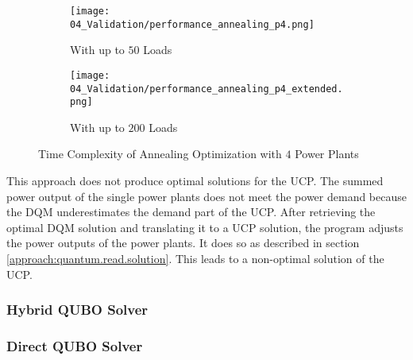 \begin{figure}
  \begin{subfigure}[b]{0.5 \textwidth}
    \centering
    \texttt{[image: 04\_Validation/performance\_annealing\_p4.png]}
    \caption{With up to $50$ Loads}
    \label{figure:validation.annealing.performance}
  \end{subfigure}
  \begin{subfigure}[b]{0.5 \textwidth}
    \centering
    \texttt{[image: 04\_Validation/performance\_annealing\_p4\_extended.png]}
    \caption{With up to $200$ Loads}
    \label{figure:validation.annealin.performance.extended}
  \end{subfigure}
  \caption{Time Complexity of Annealing Optimization with $4$ Power Plants}
\end{figure}

This approach does not produce optimal solutions for the UCP.
The summed power output of the single power plants does not meet the power demand because the DQM underestimates the demand part of the UCP.
After retrieving the optimal DQM solution and translating it to a UCP solution, the program adjusts the power outputs of the power plants.
It does so as described in section \ref{approach:quantum.read.solution}.
This leads to a non-optimal solution of the UCP.

\subsubsection{Hybrid QUBO Solver}


\subsubsection{Direct QUBO Solver}

